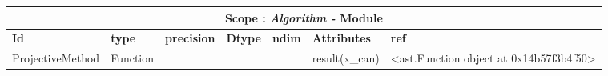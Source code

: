 \documentclass{report}
\begin{document}
\begin{center}
\begin{longtable}{|p{3.5cm}|p{1.5cm}|p{1.5cm}|p{1.5cm}|p{1cm}|p{2cm}|p{4cm}| }
\hline
\multicolumn{7}{|c|}{\textbf{Scope : \qquad}  \textbf{\textit{Algorithm - }Module}}\\ 
\hline
\textbf{Id} & \textbf{type} & \textbf{precision} & \textbf{Dtype} & \textbf{ndim} & \textbf{Attributes} & \textbf{ref} \\\hline

ProjectiveMethod & Function &  &  &  & result(x\_can) & <ast.Function object at 0x14b57f3b4f50> \\\hline

\end{longtable}
\end{center}

 \vspace{1cm}
\end{document}
